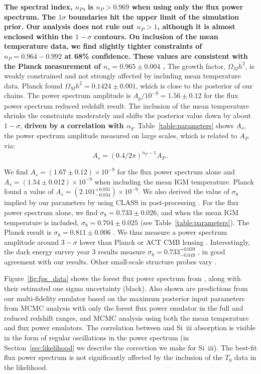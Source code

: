 \textbf{The spectral index, $n_P$, is $n_P > 0.969$ when using only the flux power spectrum. The $1\sigma$ boundaries hit the upper limit of the simulation prior. Our analysis does not rule out $n_P > 1$, although it is almost enclosed within the $1-\sigma$ contours. On inclusion of the mean temperature data, we find slightly tighter constraints of $n_P = 0.964 - 0.992$ at 68\% confidence.
These values are consistent with the Planck measurement of $n_s=0.965 \pm 0.004$ \cite{2020A&A...641A...6P}.}
The growth factor, $\Omega_M h^2$, is weakly constrained and not strongly affected by including mean temperature data.
Planck found $\Omega_M h^2 = 0.1424\pm0.001$, which is close to the posterior of our chains.
The power spectrum amplitude is $A_p/10^{-9} = 1.56 \pm 0.12$ for the flux power spectrum reduced redshift result.
The inclusion of the mean temperature shrinks the constraints moderately and shifts the posterior value down by about $1-\sigma$, \textbf{driven by a correlation with $\alpha_q$}.
Table~\ref{table:parameters} shows $A_s$, the power spectrum amplitude measured on large scales, which is related to $A_P$ via:
\begin{equation}
    A_s = \left(0.4/2\pi\right)^{n_P-1} A_P\,.
\end{equation}

We find $A_s = (1.67 \pm 0.12) \times10^{-9}$ for the flux power spectrum alone and $A_s = (1.54 \pm 0.012 )\times10^{-9}$ when including the mean IGM temperature.
Planck \cite{2020A&A...641A...6P} found a value of $A_s = \left(2.101^{+0.031}_{-0.034}\right)\times10^{-9}$. 
We also derived the value of $\sigma_8$ implied by our parameters by using CLASS in post-processing \cite{2011arXiv1104.2932L}. 
For the flux power spectrum alone, we find $\sigma_8 = 0.733 \pm 0.026$, and when the mean IGM temperature is included, $\sigma_8 = 0.704 \pm 0.025$ (see Table~\ref{table:parameters}).
The Planck result is $\sigma_8 = 0.811 \pm 0.006$ \cite{2020A&A...641A...6P}.
We thus measure a power spectrum amplitude around $3-\sigma$ lower than Planck or ACT CMB lensing \cite{2023arXiv230405202Q}.
Interestingly, the dark energy survey year 3 results measure $\sigma_8 = 0.733^{+0.039}_{-0.049}$ \cite{2022PhRvD.105b3520A}, in good agreement with our results. Other small-scale structure probes vary \cite[e.g.~][]{2020JCAP...05..042I, 2022JHEAp..34...49A, 2023JCAP...04..057Y}. 

Figure~\ref{fig:fps_data} shows the \lya forest flux power spectrum from \cite{2019JCAP...07..017C}, along with their estimated one sigma uncertainty (black).
Also shown are predictions from our multi-fidelity emulator based on the maximum posterior input parameters from MCMC analysis with only the \lya forest flux power emulator in the full and reduced redshift ranges, and MCMC analysis using both the mean temperature and flux power emulators.
The correlation between \lya and Si~{\sc iii} absorption is visible in the form of regular oscillations in the power spectrum (in Section~\ref{sec:likelihood} we describe the correction we make for Si~{\sc iii}).
The best-fit flux power spectrum is not significantly affected by the inclusion of the $T_0$ data in the likelihood. %

